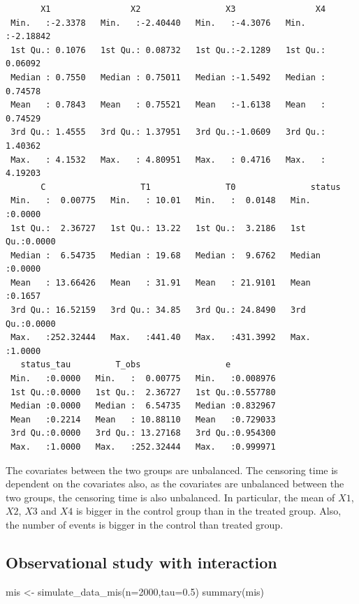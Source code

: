 \documentclass[
  11pt,
  a4paper,
]{article}
\newenvironment{Shaded}{}{}
\newcommand{\AttributeTok}[1]{\textcolor[rgb]{0.84,0.23,0.29}{#1}}
\newcommand{\DecValTok}[1]{\textcolor[rgb]{0.00,0.36,0.77}{#1}}
\newcommand{\FloatTok}[1]{\textcolor[rgb]{0.00,0.36,0.77}{#1}}
\newcommand{\FunctionTok}[1]{\textcolor[rgb]{0.44,0.26,0.76}{#1}}
\newcommand{\NormalTok}[1]{\textcolor[rgb]{0.14,0.16,0.18}{#1}}
\newcommand{\OtherTok}[1]{\textcolor[rgb]{0.44,0.26,0.76}{#1}}
\theoremstyle{plain}
\theoremstyle{plain}
\theoremstyle{plain}
\theoremstyle{definition}
\theoremstyle{remark}
\begin{document}
\begin{verbatim}
       X1                X2                 X3                X4          
 Min.   :-2.3378   Min.   :-2.40440   Min.   :-4.3076   Min.   :-2.18842  
 1st Qu.: 0.1076   1st Qu.: 0.08732   1st Qu.:-2.1289   1st Qu.: 0.06092  
 Median : 0.7550   Median : 0.75011   Median :-1.5492   Median : 0.74578  
 Mean   : 0.7843   Mean   : 0.75521   Mean   :-1.6138   Mean   : 0.74529  
 3rd Qu.: 1.4555   3rd Qu.: 1.37951   3rd Qu.:-1.0609   3rd Qu.: 1.40362  
 Max.   : 4.1532   Max.   : 4.80951   Max.   : 0.4716   Max.   : 4.19203  
       C                   T1               T0               status      
 Min.   :  0.00775   Min.   : 10.01   Min.   :  0.0148   Min.   :0.0000  
 1st Qu.:  2.36727   1st Qu.: 13.22   1st Qu.:  3.2186   1st Qu.:0.0000  
 Median :  6.54735   Median : 19.68   Median :  9.6762   Median :0.0000  
 Mean   : 13.66426   Mean   : 31.91   Mean   : 21.9101   Mean   :0.1657  
 3rd Qu.: 16.52159   3rd Qu.: 34.85   3rd Qu.: 24.8490   3rd Qu.:0.0000  
 Max.   :252.32444   Max.   :441.40   Max.   :431.3992   Max.   :1.0000  
   status_tau         T_obs                 e           
 Min.   :0.0000   Min.   :  0.00775   Min.   :0.008976  
 1st Qu.:0.0000   1st Qu.:  2.36727   1st Qu.:0.557780  
 Median :0.0000   Median :  6.54735   Median :0.832967  
 Mean   :0.2214   Mean   : 10.88110   Mean   :0.729033  
 3rd Qu.:0.0000   3rd Qu.: 13.27168   3rd Qu.:0.954300  
 Max.   :1.0000   Max.   :252.32444   Max.   :0.999971  
\end{verbatim}

The covariates between the two groups are unbalanced. The censoring time
is dependent on the covariates also, as the covariates are unbalanced
between the two groups, the censoring time is also unbalanced. In
particular, the mean of \(X1\), \(X2\), \(X3\) and \(X4\) is bigger in
the control group than in the treated group. Also, the number of events
is bigger in the control than treated group.

\subsection{Observational study with interaction}\label{sec-stat_inter}

\begin{Shaded}
\begin{Highlighting}[]
\NormalTok{mis }\OtherTok{\textless{}{-}} \FunctionTok{simulate\_data\_mis}\NormalTok{(}\AttributeTok{n=}\DecValTok{2000}\NormalTok{,}\AttributeTok{tau=}\FloatTok{0.5}\NormalTok{)}
\FunctionTok{summary}\NormalTok{(mis)}
\end{Highlighting}
\end{Shaded}
\end{document}

